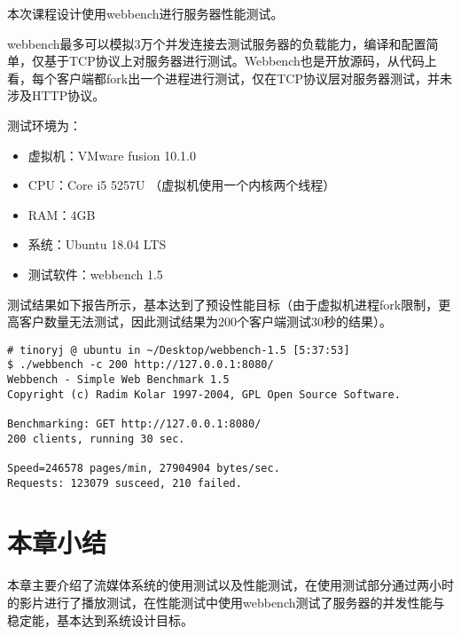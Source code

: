 \documentclass[bachelor]{thesis-uestc}
\begin{document}
本次课程设计使用webbench进行服务器性能测试。

webbench最多可以模拟3万个并发连接去测试服务器的负载能力，编译和配置简单，仅基于TCP协议上对服务器进行测试。Webbench也是开放源码，从代码上看，每个客户端都fork出一个进程进行测试，仅在TCP协议层对服务器测试，并未涉及HTTP协议。

测试环境为：

\begin{itemize}
	\item 虚拟机：VMware fusion 10.1.0
	\item CPU：Core i5 5257U （虚拟机使用一个内核两个线程）
	\item RAM：4GB
	\item 系统：Ubuntu 18.04 LTS
	\item 测试软件：webbench 1.5
\end{itemize}

测试结果如下报告所示，基本达到了预设性能目标（由于虚拟机进程fork限制，更高客户数量无法测试，因此测试结果为200个客户端测试30秒的结果）。

\begin{lstlisting}
# tinoryj @ ubuntu in ~/Desktop/webbench-1.5 [5:37:53]
$ ./webbench -c 200 http://127.0.0.1:8080/  
Webbench - Simple Web Benchmark 1.5  
Copyright (c) Radim Kolar 1997-2004, GPL Open Source Software.  
  
Benchmarking: GET http://127.0.0.1:8080/ 
200 clients, running 30 sec.  
  
Speed=246578 pages/min, 27904904 bytes/sec.  
Requests: 123079 susceed, 210 failed.  
\end{lstlisting}

\section{本章小结}

本章主要介绍了流媒体系统的使用测试以及性能测试，在使用测试部分通过两小时的影片进行了播放测试，在性能测试中使用webbench测试了服务器的并发性能与稳定能，基本达到系统设计目标。

\end{document}
